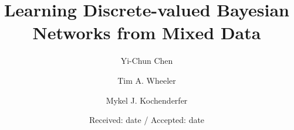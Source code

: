 \newcommand{\paren}[1]{\mathopen{}\mathclose\bgroup\left(#1\aftergroup\egroup\right)}
\newcommand{\brock}[1]{\mathopen{}\mathclose\bgroup\left[#1\aftergroup\egroup\right]}
\newcommand{\curly}[1]{\mathopen{}\mathclose\bgroup\left\{#1\aftergroup\egroup\right\}}
\newcommand{\anglebrackets}[1]{\langle #1 \rangle}
\newcommand{\ceil}[1]{\lceil #1 \rceil}
\newcommand{\floor}[1]{\lfloor #1 \rfloor}

\newcommand{\discset}{\mathcal{M}}

\DeclareMathOperator*{\argmin}{arg\,min}
\DeclareMathOperator*{\argmax}{arg\,max}

\newcommand{\todo}[1]{\textcolor{magenta}{#1}}
\newcommand{\yichun}[1]{\textit{\textcolor{green}{#1}}}
\newcommand{\tim}[1]{\textit{\textcolor{blue}{#1}}}
\newcommand{\mykel}[1]{\textit{\textcolor{cyan}{#1}}}

\DeclareMathOperator{\Pa}{pa}




\title{Learning Discrete-valued Bayesian Networks from Mixed Data%
}


\author{Yi-Chun Chen           \and
        Tim A. Wheeler         \and
        Mykel J. Kochenderfer
}



\date{Received: date / Accepted: date}


\maketitle


